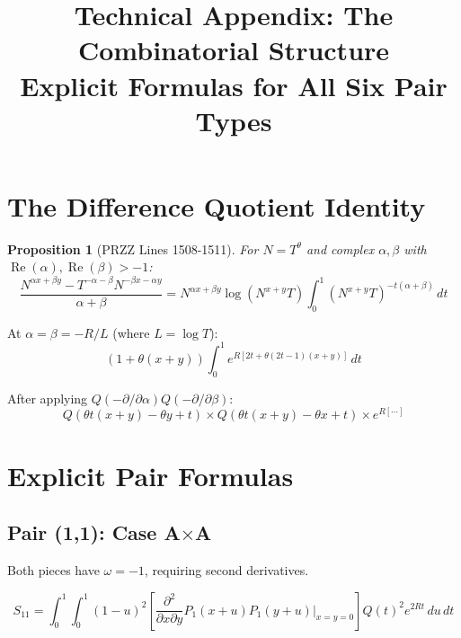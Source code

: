 \documentclass[11pt]{article}
\title{Technical Appendix: The Combinatorial Structure\\
\large Explicit Formulas for All Six Pair Types}
\author{}
\date{}
\newtheorem{proposition}{Proposition}
\begin{document}
\maketitle

\section{The Difference Quotient Identity}

\begin{proposition}[PRZZ Lines 1508-1511]
For $N = T^\theta$ and complex $\alpha, \beta$ with $\operatorname{Re}(\alpha), \operatorname{Re}(\beta) > -1$:
\begin{equation}
\frac{N^{\alpha x + \beta y} - T^{-\alpha-\beta} N^{-\beta x - \alpha y}}{\alpha + \beta}
= N^{\alpha x + \beta y} \log(N^{x+y}T) \int_0^1 (N^{x+y}T)^{-t(\alpha+\beta)} \, dt
\end{equation}
\end{proposition}

At $\alpha = \beta = -R/L$ (where $L = \log T$):
\begin{equation}
(1 + \theta(x+y)) \int_0^1 e^{R[2t + \theta(2t-1)(x+y)]} \, dt
\end{equation}

After applying $Q(-\partial/\partial\alpha) Q(-\partial/\partial\beta)$:
\begin{equation}
Q(\theta t(x+y) - \theta y + t) \times Q(\theta t(x+y) - \theta x + t) \times e^{R[\cdots]}
\end{equation}

\section{Explicit Pair Formulas}

\subsection{Pair (1,1): Case A$\times$A}

Both pieces have $\omega = -1$, requiring second derivatives.

\begin{equation}
S_{11} = \int_0^1 \int_0^1 (1-u)^2 \left[\frac{\partial^2}{\partial x \partial y} P_1(x+u) P_1(y+u) \Big|_{x=y=0}\right] Q(t)^2 e^{2Rt} \, du\, dt
\end{equation}
\end{document}
